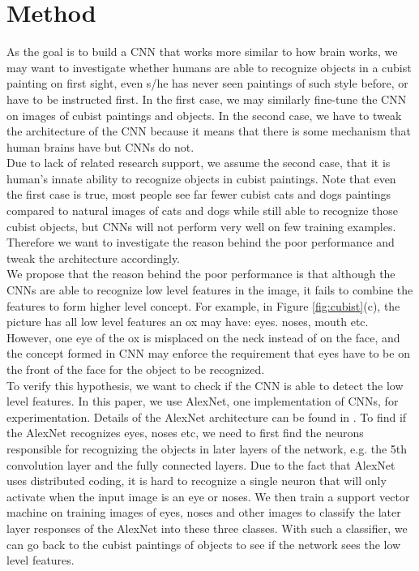 \documentclass[11pt]{article}
\begin{document}
\section{Method}
As the goal is to build a CNN that works more similar to how brain works, we may want to investigate whether humans are able to recognize objects in a cubist painting on first sight, even s/he has never seen paintings of such style before, or have to be instructed first. In the first case, we may similarly fine-tune the CNN on images of cubist paintings and objects. In the second case, we have to tweak the architecture of the CNN because it means that there is some mechanism that human brains have but CNNs do not.\\

Due to lack of related research support, we assume the second case, that it is human's innate ability to recognize objects in cubist paintings. Note that even the first case is true, most people see far fewer cubist cats and dogs paintings compared to natural images of cats and dogs while still able to recognize those cubist objects, but CNNs will not perform very well on few training examples. Therefore we want to investigate the reason behind the poor performance and tweak the architecture accordingly.\\

We propose that the reason behind the poor performance is that although the CNNs are able to recognize low level features in the image, it fails to combine the features to form higher level concept. For example, in Figure \ref{fig:cubist}(c), the picture has all low level features an ox may have: eyes. noses, mouth etc. However, one eye of the ox is misplaced on the neck instead of on the face, and the concept formed in CNN may enforce the requirement that eyes have to be on the front of the face for the object to be recognized.\\

To verify this hypothesis, we want to check if the CNN is able to detect the low level features. In this paper, we use AlexNet, one implementation of CNNs, for experimentation. Details of the AlexNet architecture can be found in \cite{key:AlexNet}. To find if the AlexNet recognizes eyes, noses etc, we need to first find the neurons responsible for recognizing the objects in later layers of the network, e.g. the 5th convolution layer and the fully connected layers. Due to the fact that AlexNet uses distributed coding, it is hard to recognize a single neuron that will only activate when the input image is an eye or noses. We then train a support vector machine on training images of eyes, noses and other images to classify the later layer responses of the AlexNet into these three classes. With such a classifier, we can go back to the cubist paintings of objects to see if the network sees the low level features.
\end{document}
